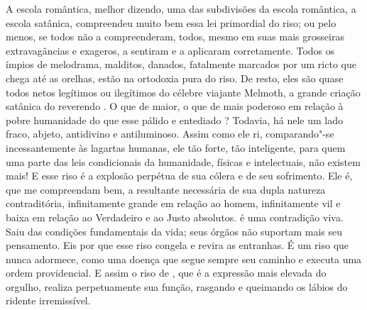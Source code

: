 A escola romântica, melhor dizendo, uma das subdivisões da escola
romântica, a escola satânica, compreendeu muito bem essa lei primordial
do riso; ou pelo menos, se todos não a compreenderam, todos, mesmo em
suas mais grosseiras extravagâncias e exageros, a sentiram e a
aplicaram corretamente. Todos os ímpios de melodrama, malditos,
danados, fatalmente marcados por um ricto que chega até as orelhas,
estão na ortodoxia pura do riso. De resto, eles são quase todos netos
legítimos ou ilegítimos do célebre viajante Melmoth, a grande criação
satânica do reverendo . O que de maior, o que de mais poderoso
em relação à pobre humanidade do que esse pálido e entediado ?
Todavia, há nele um lado fraco, abjeto, antidivino e antiluminoso.
Assim como ele ri, comparando"-se incessantemente às
lagartas humanas, ele tão forte, tão inteligente, para quem uma parte
das leis condicionais da humanidade, físicas e intelectuais, não
existem mais! E esse riso é a explosão perpétua de sua cólera e de seu
sofrimento. Ele é, que me compreendam bem, a resultante necessária de
sua dupla natureza contraditória, infinitamente grande em relação ao
homem, infinitamente vil e baixa em relação ao Verdadeiro e ao Justo
absolutos.  é uma contradição viva. Saiu das condições
fundamentais da vida; seus órgãos não suportam mais seu pensamento. Eis
por que esse riso congela e revira as entranhas. É um riso que nunca
adormece, como uma doença que segue sempre seu caminho e executa uma
ordem providencial. E assim o riso de , que é a expressão mais
elevada do orgulho, realiza perpetuamente sua função, rasgando e
queimando os lábios do ridente irremissível.

\sectionitem

